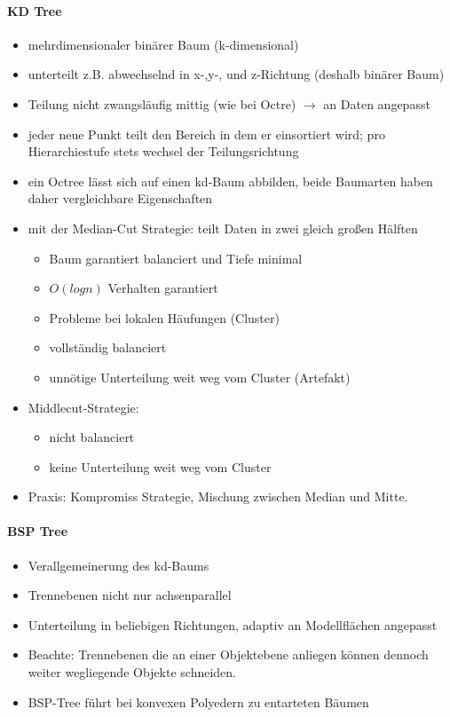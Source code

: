 \documentclass[10pt,landscape]{article}
\begin{document}
\begin{multicols}{3}
\paragraph{KD Tree}
\begin{itemize}
  \item mehrdimensionaler binärer Baum (k-dimensional)
  \item unterteilt z.B. abwechselnd in x-,y-, und z-Richtung (deshalb binärer Baum)
  \item Teilung nicht zwangsläufig mittig (wie bei Octre) $\rightarrow$ an Daten angepasst
  \item jeder neue Punkt teilt den Bereich in dem er einsortiert wird; pro Hierarchiestufe stets wechsel der Teilungsrichtung
  \item ein Octree lässt sich auf einen kd-Baum abbilden, beide Baumarten haben daher vergleichbare Eigenschaften
  \item mit der Median-Cut Strategie: teilt Daten in zwei gleich großen Hälften
        \begin{itemize}
          \item Baum garantiert balanciert und Tiefe minimal
          \item $O(log n)$ Verhalten garantiert
          \item Probleme bei lokalen Häufungen (Cluster)
          \item vollständig balanciert
          \item unnötige Unterteilung weit weg vom Cluster (Artefakt)
        \end{itemize}
  \item Middlecut-Strategie:
        \begin{itemize}
          \item nicht balanciert
          \item keine Unterteilung weit weg vom Cluster
        \end{itemize}
  \item Praxis: Kompromiss Strategie, Mischung zwischen Median und Mitte.
\end{itemize}

\paragraph{BSP Tree}
\begin{itemize}
  \item Verallgemeinerung des kd-Baums
  \item Trennebenen nicht nur achsenparallel
  \item Unterteilung in beliebigen Richtungen, adaptiv an Modellflächen angepasst
  \item Beachte: Trennebenen die an einer Objektebene anliegen können dennoch weiter wegliegende Objekte schneiden.
  \item BSP-Tree führt bei konvexen Polyedern zu entarteten Bäumen
\end{itemize}


\end{multicols}
\end{document}
